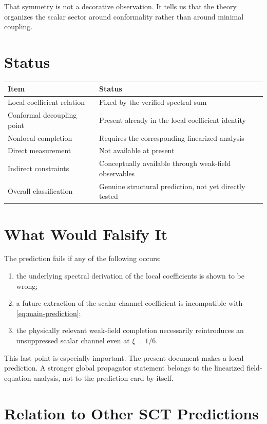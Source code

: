 \documentclass[11pt,a4paper]{article}
\begin{document}
That symmetry is not a decorative observation.  It tells us that the theory
organizes the scalar sector around conformality rather than around minimal
coupling.

\section{Status}
\label{sec:status}

\begin{longtable}{p{4.4cm}p{9.1cm}}
\toprule
\textbf{Item} & \textbf{Status} \\
\midrule
Local coefficient relation & Fixed by the verified spectral sum \\
Conformal decoupling point & Present already in the local coefficient identity \\
Nonlocal completion & Requires the corresponding linearized analysis \\
Direct measurement & Not available at present \\
Indirect constraints & Conceptually available through weak-field observables \\
Overall classification & Genuine structural prediction, not yet directly tested \\
\bottomrule
\end{longtable}

\section{What Would Falsify It}
\label{sec:falsify}

The prediction fails if any of the following occurs:
\begin{enumerate}[label=\arabic*.]
  \item the underlying spectral derivation of the local coefficients is shown
  to be wrong;
  \item a future extraction of the scalar-channel coefficient is incompatible
  with \eqref{eq:main-prediction};
  \item the physically relevant weak-field completion necessarily reintroduces
  an unsuppressed scalar channel even at $\xi = 1/6$.
\end{enumerate}

This last point is especially important.  The present document makes a local
prediction.  A stronger global propagator statement belongs to the linearized
field-equation analysis, not to the prediction card by itself.

\section{Relation to Other SCT Predictions}
\label{sec:relation}
\end{document}
